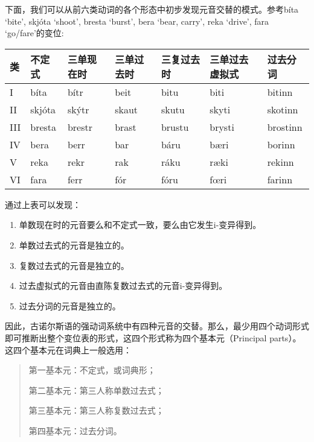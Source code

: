 下面，我们可以从前六类动词的各个形态中初步发现元音交替的模式。参考bíta `bite', skjóta `shoot', bresta `burst', bera `bear, carry', reka `drive‌', fara `go/fare‌'的变位:
\begin{longtable}{lllllll}
    \toprule
    类  & 不定式 & 三单现在时 & 三单过去时 & 三复过去时 & 三单过去虚拟式 & 过去分词 \\
    \midrule
    \endhead
    \bottomrule
    \endfoot
    I   & bíta   & bítr       & beit       & bitu       & biti           & bitinn   \\
    II  & skjóta & skýtr      & skaut      & skutu      & skyti          & skotinn  \\
    III & bresta & brestr     & brast      & brustu     & brysti         & brostinn \\
    IV  & bera   & berr       & bar        & báru       & bæri           & borinn   \\
    V   & reka   & rekr       & rak        & ráku       & ræki           & rekinn   \\
    VI  & fara   & ferr       & fór        & fóru       & fœri           & farinn   \\
\end{longtable}

通过上表可以发现：
\begin{info}
    \begin{enumerate}
        \item  单数现在时的元音要么和不定式一致，要么由它发生i-变异得到。
        \item  单数过去式的元音是独立的。
        \item  复数过去式的元音是独立的。
        \item  过去虚拟式的元音由直陈复数过去式的元音i-变异得到。
        \item  过去分词的元音是独立的。
    \end{enumerate}
\end{info}

因此，古诺尔斯语的强动词系统中有四种元音的交替。那么，最少用四个动词形式即可推断出整个变位表的形式，这四个形式称为四个基本元（Principal parts）。这四个基本元在词典上一般选用：
\begin{quote}
    第一基本元：不定式，或词典形；

    第二基本元：第三人称单数过去式；

    第三基本元：第三人称复数过去式；

    第四基本元：过去分词。
\end{quote}

